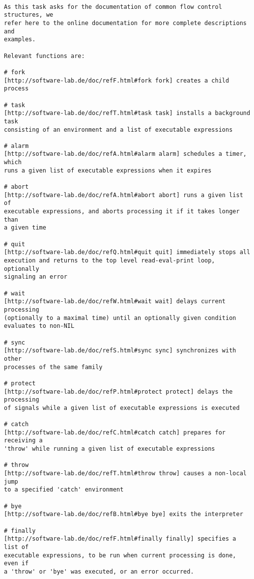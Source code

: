 \begin{verbatim}

As this task asks for the documentation of common flow control structures, we
refer here to the online documentation for more complete descriptions and
examples.

Relevant functions are:

# fork
[http://software-lab.de/doc/refF.html#fork fork] creates a child process

# task
[http://software-lab.de/doc/refT.html#task task] installs a background task
consisting of an environment and a list of executable expressions

# alarm
[http://software-lab.de/doc/refA.html#alarm alarm] schedules a timer, which
runs a given list of executable expressions when it expires

# abort
[http://software-lab.de/doc/refA.html#abort abort] runs a given list of
executable expressions, and aborts processing it if it takes longer than
a given time

# quit
[http://software-lab.de/doc/refQ.html#quit quit] immediately stops all
execution and returns to the top level read-eval-print loop, optionally
signaling an error

# wait
[http://software-lab.de/doc/refW.html#wait wait] delays current processing
(optionally to a maximal time) until an optionally given condition
evaluates to non-NIL

# sync
[http://software-lab.de/doc/refS.html#sync sync] synchronizes with other
processes of the same family

# protect
[http://software-lab.de/doc/refP.html#protect protect] delays the processing
of signals while a given list of executable expressions is executed

# catch
[http://software-lab.de/doc/refC.html#catch catch] prepares for receiving a
'throw' while running a given list of executable expressions

# throw
[http://software-lab.de/doc/refT.html#throw throw] causes a non-local jump
to a specified 'catch' environment

# bye
[http://software-lab.de/doc/refB.html#bye bye] exits the interpreter

# finally
[http://software-lab.de/doc/refF.html#finally finally] specifies a list of
executable expressions, to be run when current processing is done, even if
a 'throw' or 'bye' was executed, or an error occurred.

\end{verbatim}

